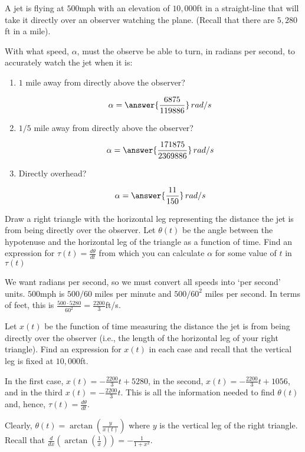 \documentclass{ximera}
\author{Gregory Hartman \and Matthew Carr}
\begin{document}
\begin{exercise}



A jet is flying at $500$mph with an elevation of $10,000$ft in a
straight-line that will take it directly over an observer watching the
plane. (Recall that there are $5,280$ft in a mile).

With what speed, $\alpha$, must the observe be able to turn, in
radians per second, to accurately watch the jet when it is:
\begin{enumerate}
\item $1$ mile away from directly above the observer? \begin{prompt}\[\alpha=\answer{\frac{6875}{119886}}\,rad/s\]\end{prompt}
\item $1/5$ mile away from directly above the observer? \begin{prompt}\[\alpha=\answer{\frac{171875}{2369886}}\,rad/s\]\end{prompt}
\item Directly overhead? \begin{prompt}\[\alpha=\answer{\frac{11}{150}}\,rad/s\]\end{prompt}
\end{enumerate}

\begin{hint}
Draw a right triangle with the horizontal leg representing the
distance the jet is from being directly over the observer. Let
$\theta(t)$ be the angle between the hypotenuse and the horizontal leg
of the triangle as a function of time. Find an expression for
$\tau(t)=\frac{d\theta}{dt}$ from which you can calculate $\alpha$ for
some value of $t$ in $\tau(t)$
\end{hint}
\begin{hint}
We want radians per second, so we must convert all speeds into `per
second' units. $500$mph is $500/{60}$ miles per minute and
$500/{60^2}$ miles per second. In terms of feet, this is
$\frac{500\cdot5280}{60^2}=\frac{2200}{3}$ft/s.
\end{hint}
\begin{hint}
Let $x(t)$ be the function of time measuring the distance the jet is
from being directly over the observer (i.e., the length of the
horizontal leg of your right triangle). Find an expression for $x(t)$
in each case and recall that the vertical leg is fixed at $10,000$ft.
\end{hint}
\begin{hint}
In the first case, $x(t)=-\frac{2200}{3}t+5280$, in the second,
$x(t)=-\frac{2200}{3}t+1056$, and in the third
$x(t)=-\frac{2200}{3}t$. This is all the information needed to find
$\theta(t)$ and, hence, $\tau(t)=\frac{d\theta}{dt}$.
\end{hint}
\begin{hint}
Clearly, $\theta(t)=\arctan(\frac{y}{x(t)})$ where $y$ is the vertical
leg of the right triangle. Recall that
$\frac{d}{dx}(\arctan(\frac{1}{x}))=-\frac{1}{1+x^2}$.


\end{hint}
\end{exercise}
\end{document}
